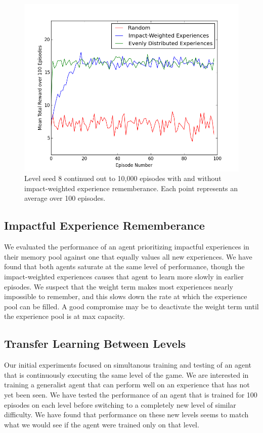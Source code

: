 \documentclass{article}
\begin{document}
 \begin{figure}
 \begin{center}
 \includegraphics[scale=0.42]{10000epsSeed8.png}
\caption{Level seed 8 continued out to 10,000 episodes with and without impact-weighted experience rememberance. Each point represents an average over 100 episodes.}
 \end{center}
 \end{figure}
 
 \subsection{Impactful Experience Rememberance}
 We evaluated the performance of an agent prioritizing impactful experiences in their memory pool against one that equally values all new experiences. We have found that both agents saturate at the same level of performance, though the impact-weighted experiences causes that agent to learn more slowly in earlier episodes. We suspect that the weight term makes most experiences nearly impossible to remember, and this slows down the rate at which the experience pool can be filled. A good compromise may be to deactivate the weight term until the experience pool is at max capacity.
 
 \subsection{Transfer Learning Between Levels}
 
 Our initial experiments focused on simultanous training and testing of an agent that is continuously executing the same level of the game. We are interested in training a generalist agent that can perform well on an experience that has not yet been seen. We have tested the performance of an agent that is trained for 100 episodes on each level before switching to a completely new level of similar difficulty. We have found that performance on these new levels seems to match what we would see if the agent were trained only on that level.
 
\end{document}
